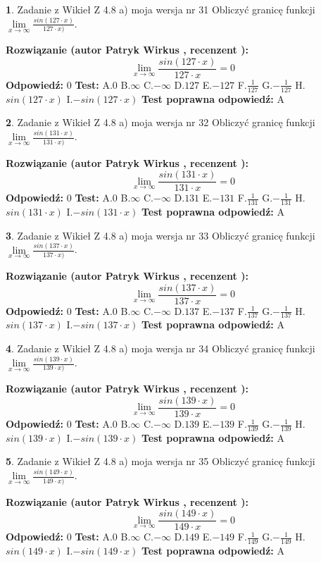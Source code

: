 \documentclass[12pt, a4paper]{article}
\theoremstyle{definition} %
\newtheorem{zad}{}
\newcommand{\zadStart}[1]{\begin{zad}#1\newline}
\newcommand{\zadStop}{\end{zad}}
\newcommand{\rozwStart}[2]{\noindent \textbf{Rozwiązanie (autor #1 , recenzent #2): }\newline}
\newcommand{\rozwStop}{\newline}
\newcommand{\odpStart}{\noindent \textbf{Odpowiedź:}\newline}
\newcommand{\odpStop}{\newline}
\newcommand{\testStart}{\noindent \textbf{Test:}\newline}
\newcommand{\testStop}{\newline}
\newcommand{\kluczStart}{\noindent \textbf{Test poprawna odpowiedź:}\newline}
\newcommand{\kluczStop}{\newline}
\begin{document}
\zadStart{Zadanie z Wikieł Z 4.8 a) moja wersja nr 31}
Obliczyć granicę funkcji $\lim\limits_{x\to \infty}\frac{sin(127\cdot x)}{127\cdot x)}$.
\zadStop
\rozwStart{Patryk Wirkus}{}
$$\lim\limits_{x\to \infty}\frac{sin(127\cdot x)}{127\cdot x}=
0$$
\rozwStop
\odpStart
$0$
\odpStop
\testStart
A.$0$ B.$\infty$ C.$-\infty$ D.$127$ E.$-127$
F.$\frac{1}{127}$ G.$-\frac{1}{127}$
H.$sin(127\cdot x)$
I.$-sin(127\cdot x)$
\testStop
\kluczStart
A
\kluczStop



\zadStart{Zadanie z Wikieł Z 4.8 a) moja wersja nr 32}
Obliczyć granicę funkcji $\lim\limits_{x\to \infty}\frac{sin(131\cdot x)}{131\cdot x)}$.
\zadStop
\rozwStart{Patryk Wirkus}{}
$$\lim\limits_{x\to \infty}\frac{sin(131\cdot x)}{131\cdot x}=
0$$
\rozwStop
\odpStart
$0$
\odpStop
\testStart
A.$0$ B.$\infty$ C.$-\infty$ D.$131$ E.$-131$
F.$\frac{1}{131}$ G.$-\frac{1}{131}$
H.$sin(131\cdot x)$
I.$-sin(131\cdot x)$
\testStop
\kluczStart
A
\kluczStop



\zadStart{Zadanie z Wikieł Z 4.8 a) moja wersja nr 33}
Obliczyć granicę funkcji $\lim\limits_{x\to \infty}\frac{sin(137\cdot x)}{137\cdot x)}$.
\zadStop
\rozwStart{Patryk Wirkus}{}
$$\lim\limits_{x\to \infty}\frac{sin(137\cdot x)}{137\cdot x}=
0$$
\rozwStop
\odpStart
$0$
\odpStop
\testStart
A.$0$ B.$\infty$ C.$-\infty$ D.$137$ E.$-137$
F.$\frac{1}{137}$ G.$-\frac{1}{137}$
H.$sin(137\cdot x)$
I.$-sin(137\cdot x)$
\testStop
\kluczStart
A
\kluczStop



\zadStart{Zadanie z Wikieł Z 4.8 a) moja wersja nr 34}
Obliczyć granicę funkcji $\lim\limits_{x\to \infty}\frac{sin(139\cdot x)}{139\cdot x)}$.
\zadStop
\rozwStart{Patryk Wirkus}{}
$$\lim\limits_{x\to \infty}\frac{sin(139\cdot x)}{139\cdot x}=
0$$
\rozwStop
\odpStart
$0$
\odpStop
\testStart
A.$0$ B.$\infty$ C.$-\infty$ D.$139$ E.$-139$
F.$\frac{1}{139}$ G.$-\frac{1}{139}$
H.$sin(139\cdot x)$
I.$-sin(139\cdot x)$
\testStop
\kluczStart
A
\kluczStop



\zadStart{Zadanie z Wikieł Z 4.8 a) moja wersja nr 35}
Obliczyć granicę funkcji $\lim\limits_{x\to \infty}\frac{sin(149\cdot x)}{149\cdot x)}$.
\zadStop
\rozwStart{Patryk Wirkus}{}
$$\lim\limits_{x\to \infty}\frac{sin(149\cdot x)}{149\cdot x}=
0$$
\rozwStop
\odpStart
$0$
\odpStop
\testStart
A.$0$ B.$\infty$ C.$-\infty$ D.$149$ E.$-149$
F.$\frac{1}{149}$ G.$-\frac{1}{149}$
H.$sin(149\cdot x)$
I.$-sin(149\cdot x)$
\testStop
\kluczStart
A
\kluczStop
\end{document}
